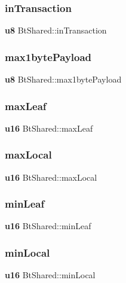 \subsubsection{inTransaction}
{\footnotesize\ttfamily \textbf{ u8} Bt\+Shared\+::in\+Transaction}

\mbox{\label{struct_bt_shared_ae0a261001a5237cd705fa16f0d00ad16}} 
\subsubsection{max1bytePayload}
{\footnotesize\ttfamily \textbf{ u8} Bt\+Shared\+::max1byte\+Payload}

\mbox{\label{struct_bt_shared_a474248f018d24457ec306a7b570d24ce}} 
\subsubsection{maxLeaf}
{\footnotesize\ttfamily \textbf{ u16} Bt\+Shared\+::max\+Leaf}

\mbox{\label{struct_bt_shared_a2937d14071841fe0ecae3ce1eb1da96c}} 
\subsubsection{maxLocal}
{\footnotesize\ttfamily \textbf{ u16} Bt\+Shared\+::max\+Local}

\mbox{\label{struct_bt_shared_ad57c14f1681d0e86f1c9a9488013eba0}} 
\subsubsection{minLeaf}
{\footnotesize\ttfamily \textbf{ u16} Bt\+Shared\+::min\+Leaf}

\mbox{\label{struct_bt_shared_affb40500b5c63601ef3ca3600983b12c}} 
\subsubsection{minLocal}
{\footnotesize\ttfamily \textbf{ u16} Bt\+Shared\+::min\+Local}

\mbox{\label{struct_bt_shared_a454c31d726220bbed43c165e370460c8}} 
